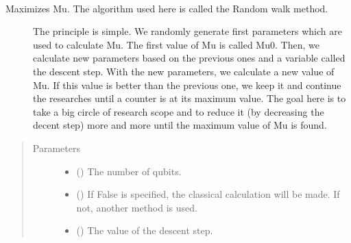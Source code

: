 \documentclass[letterpaper,10pt,english]{sphinxmanual}
\begin{document}

\begin{fulllineitems}
\label{\detokenize{mermin_polynomials-opti:mermin_on_qiskit.hypergraphstates_optimization.mermin_polynomials.xbest_calculation}}~\begin{description}
\item[{Maximizes Mu. The algorithm used here is called the Random walk method. }] \leavevmode
The principle is simple. We randomly generate first parameters which are 
used to calculate Mu. The first value of Mu is called Mu0. Then, we 
calculate new parameters based on the previous ones and a variable 
called the descent step. With the new parameters, we calculate a new 
value of Mu. If this value is better than the previous one, we keep it 
and continue the researches until a counter is at its maximum value. The 
goal here is to take a big circle of research scope and to reduce it (by
decreasing the decent step) more and more until the maximum value of Mu 
is found.

\end{description}
\begin{quote}\begin{description}
\item[{Parameters}] \leavevmode\begin{itemize}
\item {} 
 () \textendash{} The number of qubits.

\item {} 
 () \textendash{} If False is specified, the classical calculation 
will be made. If not, another method is used.

\item {} 
 () \textendash{} The value of the descent step.


\end{itemize}
\end{description}
\end{quote}
\end{fulllineitems}
\end{document}
